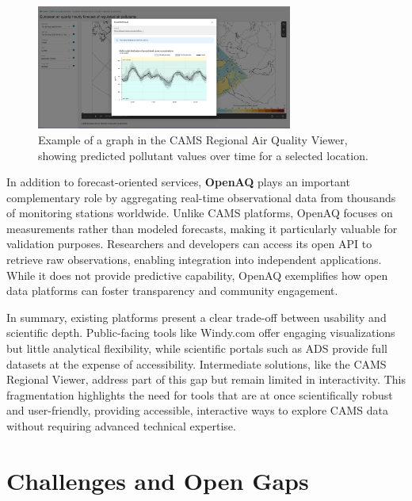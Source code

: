 \begin{figure}[h!btp]
	\centering
	\includegraphics[width=0.75\textwidth]{fig/regional-example2.png}
	\caption[CAMS Regional Viewer - Graph]{Example of a graph in the CAMS Regional Air Quality Viewer, showing predicted pollutant values over time for a selected location.}
	\label{fig:regional-graph}
\end{figure}

In addition to forecast-oriented services, \textbf{OpenAQ} plays an important complementary role by aggregating real-time observational data from thousands of monitoring stations worldwide. Unlike CAMS platforms, OpenAQ focuses on measurements rather than modeled forecasts, making it particularly valuable for validation purposes. Researchers and developers can access its open API to retrieve raw observations, enabling integration into independent applications. While it does not provide predictive capability, OpenAQ exemplifies how open data platforms can foster transparency and community engagement.

In summary, existing platforms present a clear trade-off between usability and scientific depth. Public-facing tools like Windy.com offer engaging visualizations but little analytical flexibility, while scientific portals such as ADS provide full datasets at the expense of accessibility. Intermediate solutions, like the CAMS Regional Viewer, address part of this gap but remain limited in interactivity. This fragmentation highlights the need for tools that are at once scientifically robust and user-friendly, providing accessible, interactive ways to explore CAMS data without requiring advanced technical expertise.



\section{Challenges and Open Gaps}

